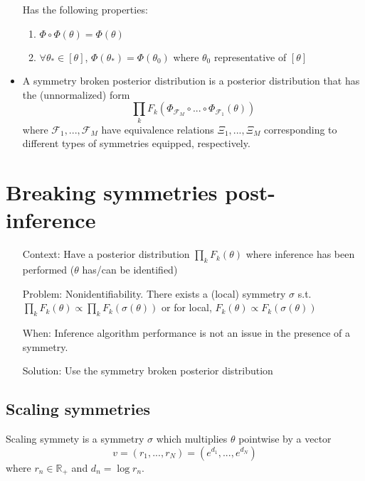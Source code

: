 \documentclass{article}
\begin{document}
\begin{itemize}
Has the following properties:
\begin{enumerate}

\item
$\Phi\circ\Phi(\theta) = \Phi(\theta)$

\item
$\forall \theta_*\in[\theta]$, $\Phi(\theta_*) = \Phi(\theta_0)$ where $\theta_0$ representative of $[\theta]$

\end{enumerate}

\item
A symmetry broken posterior distribution is a posterior distribution that has the (unnormalized) form
\[
\prod_kF_k(\Phi_{\mathcal{F}_M}\circ ... \circ \Phi_{\mathcal{F}_1}(\theta))
\]
where $\mathcal{F}_1,...,\mathcal{F}_M$ have equivalence relations $\Xi_1,...,\Xi_M$ corresponding to different types of symmetries equipped, respectively.

\end{itemize}


\section{Breaking symmetries post-inference}

\begin{itemize}

\item[Context:]
Have a posterior distribution $\prod_kF_k(\theta)$ where inference has been performed ($\theta$ has/can be identified)

\item[Problem:]
Nonidentifiability. There exists a (local) symmetry $\sigma$ s.t. $\prod_kF_k(\theta) \propto \prod_kF_k(\sigma(\theta))$ or for local, $F_k(\theta)\propto F_k(\sigma(\theta))$

\item[When:]
Inference algorithm performance is not an issue in the presence of a symmetry.

\item[Solution:]
Use the symmetry broken posterior distribution

\end{itemize}


\subsection{Scaling symmetries}

Scaling symmety is a symmetry $\sigma$ which multiplies $\theta$ pointwise by a vector
\[
v=(r_1,...,r_N) = (e^{d_1},...,e^{d_N})
\]
where $r_n\in \mathbb{R}_+$ and $d_n=\log r_n$.
\end{document}
